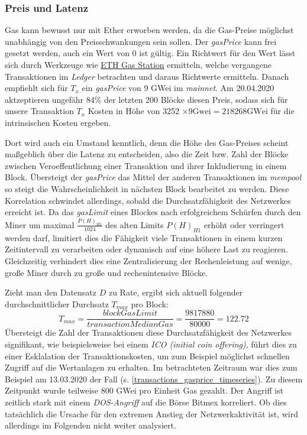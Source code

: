 \documentclass[runningheads]{llncs}
\begin{document}
\subsubsection{Preis und Latenz}
Gas kann bewusst nur mit Ether erworben werden, da die Gas-Preise möglichst unabhängig von den Preisschwankungen sein sollen. Der \textit{gasPrice} kann frei gesetzt werden, auch ein Wert von 0 ist gültig. Ein Richtwert für den Wert lässt sich durch Werkzeuge wie \href{https://www.ethgasstation.info/}{ETH Gas Station} ermitteln, welche vergangene Transaktionen im \textit{Ledger} betrachten und daraus Richtwerte ermitteln. Danach empfiehlt sich für $ T_x $ ein \textit{gasPrice} von 9 GWei im \textit{mainnet}. Am 20.04.2020 aktzeptieren ungefähr 84\% der letzten 200 Blöcke diesen Preis, sodass sich für unsere Transaktion $ T_x $ Kosten in Höhe von 3252 $ \times 9 \text{Gwei} = 218268 \text{GWei} $ für die intrinsischen Kosten ergeben.

Dort wird auch ein Umstand kenntlich, denn die Höhe des Gas-Preises scheint maßgeblich über die Latenz zu entscheiden, also die Zeit bzw. Zahl der Blöcke zwischen Veroeffentlichung einer Transaktion und ihrer Inkludierung in einem Block. Übersteigt der \textit{gasPrice} das Mittel der anderen Transaktionen im \textit{mempool} so steigt die Wahrscheinlichkeit in nächsten Block bearbeitet zu werden. Diese Korrelation schwindet allerdings, sobald die Durchsatzfähigkeit des Netzwerkes erreicht ist. \cite[S. 30 f.]{pierro_influence_2019} Da das \textit{gasLimit} eines Blockes nach erfolgreichem Schürfen durch den Miner um maximal $ \frac{P(H)_{H1}}{1024} $ des alten Limits  $ P(H)_{H1} $ erhöht oder verringert werden darf, limitiert dies die Fähigkeit viele Transaktionen in einem kurzen Zeitintervall zu verarbeiten oder dynamisch auf eine höhere Last zu reagieren. Gleichzeitig  verhindert dies eine Zentralisierung der Rechenleistung auf wenige, große Miner durch zu große und rechenintensive Blöcke.

Zieht man den Datensatz $ D $ zu Rate, ergibt sich aktuell folgender durchschnittlicher Durchsatz $ T_{max} $ pro Block: \cite{neemann_appendix_nodate}
$$
  T_{max} = \frac{\textit{blockGasLimit}}{\textit{transactionMedianGas}} = \frac{9817880}{80000} = 122.72
$$
Übersteigt die Zahl der  Transaktionen diese Durchsatzfähigkeit des Netzwerkes signifikant, wie beispielsweise bei einem \textit{ICO (initial coin offering)}, führt dies zu einer Esklalation der Transaktionskosten, um zum Beispiel möglichst schnellen Zugriff auf die Wertanlagen zu erhalten. \cite[S. 9:6 f.]{m.spain_oasics-tokeneconomics_2019} Im betrachteten Zeitraum war dies zum Beispiel am 13.03.2020 der Fall (s. \ref{transactions_gasprice_timeseries}). Zu diesem Zeitpunkt wurde teilweise 800 GWei pro Einheit Gas gezahlt. Der Angriff ist zeitlich stark mit einem \textit{DOS-Angriff} auf die Börse Bitmex korreliert. Ob dies tatsächlich die Ursache für den extremen Anstieg der Netzwerkaktivität ist, wird allerdings im Folgenden nicht weiter analysiert. \cite{bitmex_ddos_nodate}
\end{document}
